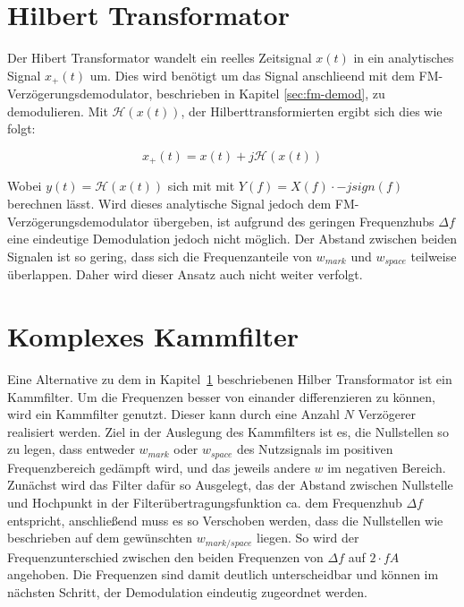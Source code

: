 \documentclass{article}
\begin{document}
%    
%

\section{Hilbert Transformator}\label{sec:hilbert}
Der Hibert Transformator wandelt ein reelles Zeitsignal $x(t)$ in ein analytisches Signal $x_+(t)$ um.
Dies wird benötigt um das Signal anschlieend mit dem FM-Verzögerungsdemodulator, beschrieben in Kapitel \ref{sec:fm-demod}, zu demodulieren.
Mit $\mathcal{H}(x(t))$, der Hilberttransformierten ergibt sich dies wie folgt:

$$ 
x_+(t) = x(t) + j \mathcal{H}(x(t))
$$

Wobei $y(t) = \mathcal{H}(x(t))$ sich mit mit $Y(f) = X(f) \cdot -j sign(f)$ berechnen lässt.
Wird dieses analytische Signal jedoch dem FM-Verzögerungsdemodulator übergeben, ist aufgrund des 
geringen Frequenzhubs $\varDelta f$ eine eindeutige Demodulation jedoch nicht möglich. Der Abstand zwischen beiden Signalen ist so gering, dass sich die 
Frequenzanteile von $w_{mark}$ und $w_{space}$ teilweise überlappen. Daher wird
dieser Ansatz auch nicht weiter verfolgt.


\section{Komplexes Kammfilter}\label{sec:comb}
Eine Alternative zu dem in Kapitel~\ref{sec:hilbert} beschriebenen Hilber Transformator ist ein Kammfilter.
Um die Frequenzen besser von einander differenzieren zu können, wird ein Kammfilter genutzt. Dieser kann durch eine Anzahl $N$ Verzögerer realisiert werden.
Ziel in der Auslegung des Kammfilters ist es, die Nullstellen so zu legen, dass entweder $w_{mark}$ oder $w_{space}$ des Nutzsignals im positiven Frequenzbereich
gedämpft wird, und das jeweils andere $w$ im negativen Bereich. Zunächst wird das Filter dafür so Ausgelegt, das der Abstand zwischen
Nullstelle und Hochpunkt in der Filterübertragungsfunktion ca. dem Frequenzhub $\varDelta f$ entspricht, anschließend muss es so Verschoben werden, dass die Nullstellen wie beschrieben auf dem
gewünschten $w_{mark/space}$ liegen.
So wird der Frequenzunterschied zwischen den beiden Frequenzen von $\varDelta f$ auf $2\cdot fA$ angehoben.
Die Frequenzen sind damit deutlich unterscheidbar und können im nächsten Schritt, der Demodulation eindeutig zugeordnet werden. 
\end{document}
